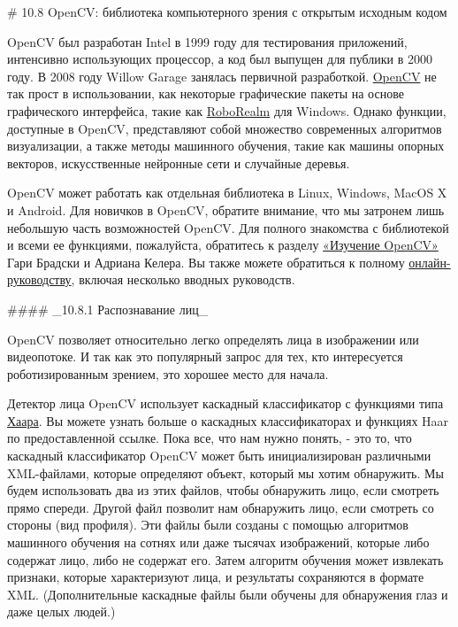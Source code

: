 # 10.8 OpenCV: библиотека компьютерного зрения с открытым исходным кодом


OpenCV был разработан Intel в 1999 году для тестирования приложений, интенсивно использующих процессор, а код был выпущен для публики в 2000 году. В 2008 году Willow Garage занялась первичной разработкой. \href{http://www.opencv.org/}{OpenCV} не так прост в использовании, как некоторые графические пакеты на основе графического интерфейса, такие как \href{http://www.roborealm.com/}{RoboRealm} для Windows. Однако функции, доступные в OpenCV, представляют собой множество современных алгоритмов визуализации, а также методы машинного обучения, такие как машины опорных векторов, искусственные нейронные сети и случайные деревья.

OpenCV может работать как отдельная библиотека в Linux, Windows, MacOS X и Android. Для новичков в OpenCV, обратите внимание, что мы затронем лишь небольшую часть возможностей OpenCV. Для полного знакомства с библиотекой и всеми ее функциями, пожалуйста, обратитесь к разделу \href{http://www.amazon.com/Learning-OpenCV-Computer-Vision-Library/dp/0596516134}{«Изучение OpenCV»} Гари Брадски и Адриана Келера. Вы также можете обратиться к полному \href{http://docs.opencv.org/}{онлайн-руководству}, включая несколько вводных руководств.

#### _10.8.1 Распознавание лиц_

OpenCV позволяет относительно легко определять лица в изображении или видеопотоке. И так как это популярный запрос для тех, кто интересуется роботизированным зрением, это хорошее место для начала.

Детектор лица OpenCV использует каскадный классификатор с функциями типа \href{http://docs.opencv.org/modules/objdetect/doc/cascade_classification.html}{Хаара}. Вы можете узнать больше о каскадных классификаторах и функциях Haar по предоставленной ссылке. Пока все, что нам нужно понять, - это то, что каскадный классификатор OpenCV может быть инициализирован различными XML-файлами, которые определяют объект, который мы хотим обнаружить. Мы будем использовать два из этих файлов, чтобы обнаружить лицо, если смотреть прямо спереди. Другой файл позволит нам обнаружить лицо, если смотреть со стороны (вид профиля). Эти файлы были созданы с помощью алгоритмов машинного обучения на сотнях или даже тысячах изображений, которые либо содержат лицо, либо не содержат его. Затем алгоритм обучения может извлекать признаки, которые характеризуют лица, и результаты сохраняются в формате XML. (Дополнительные каскадные файлы были обучены для обнаружения глаз и даже целых людей.)

